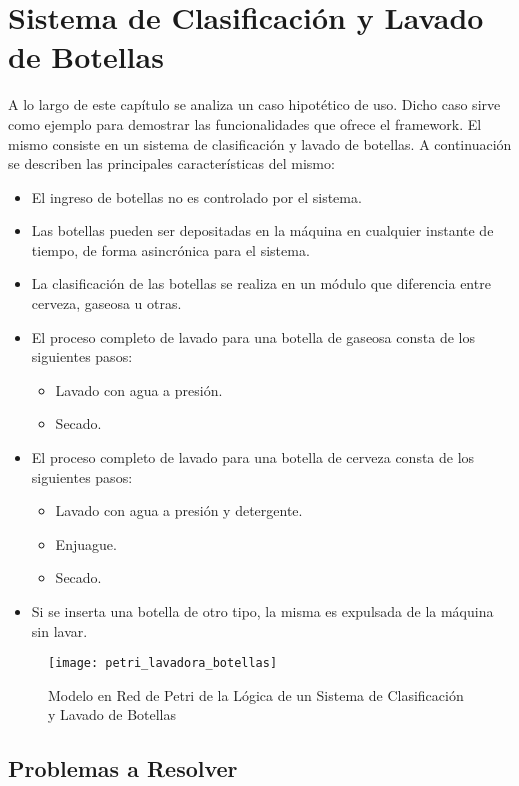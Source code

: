 \section {Sistema de Clasificación y Lavado de Botellas}
A lo largo de este capítulo se analiza un caso hipotético de uso.
Dicho caso sirve como ejemplo para demostrar las funcionalidades que ofrece el
framework. El mismo consiste en un sistema de clasificación y lavado de
botellas.
A continuación se describen las principales características del mismo:

\begin{itemize}
  \item El ingreso de botellas no es controlado por el sistema.
  \item Las botellas pueden ser depositadas en la máquina en cualquier instante
  de tiempo, de forma asincrónica para el sistema.
  \item La clasificación de las botellas se realiza en un módulo que
  diferencia entre cerveza, gaseosa u otras.
  \item El proceso completo de lavado para una botella de gaseosa consta de los
  siguientes pasos:
	  \begin{itemize} 
	    \item Lavado con agua a presión.
	    \item Secado.
	  \end{itemize}
  \item El proceso completo de lavado para una botella de cerveza consta de los
  siguientes pasos:
	  \begin{itemize} 
	    \item Lavado con agua a presión y detergente.
	    \item Enjuague.
	    \item Secado.
	  \end{itemize}
  \item Si se inserta una botella de otro tipo, la misma es expulsada de la
	máquina sin lavar.
\end{itemize}

\begin{figure}[H]
	\centering
	\texttt{[image: petri\_lavadora\_botellas]}
	\caption{Modelo en Red de Petri de la Lógica de un Sistema de Clasificación y
	Lavado de Botellas}
	\label{fig:petri_lavadora_botellas}
\end{figure}

\subsection {Problemas a Resolver}

